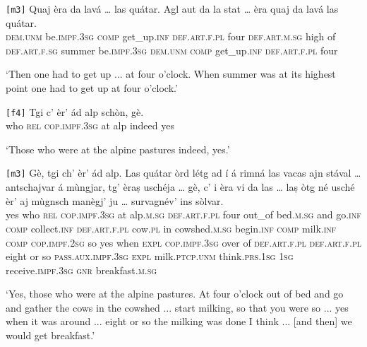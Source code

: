 \begin{linenumbers}
	\gll \texttt{[m3]} Quaj èra da lavá … las quátar. Agl aut da la stat … èra quaj da lavá las quátar.\\
	{} \textsc{dem.unm} be.\textsc{impf.3sg} \textsc{comp} get\_up.\textsc{inf} {} \textsc{def.art.f.pl} four \textsc{def.art.m.sg} high of \textsc{def.art.f.sg} summer {} be.\textsc{impf.3sg} \textsc{dem.unm} \textsc{comp} get\_up.\textsc{inf} \textsc{def.art.f.pl} four \\
	\end{linenumbers}
\medskip
\glt `Then one had to get up ... at four o'clock. When summer was at its highest point one had to get up at four o'clock.'
\medskip

\begin{linenumbers}
	\gll \texttt{[f4]} Tgi c’ èr’ ád alp schòn, gè.   \\
	{} who \textsc{rel} \textsc{cop.impf.3sg} at alp indeed yes\\
\end{linenumbers}
\medskip
\glt `Those who were at the alpine pastures indeed, yes.'
\medskip

\begin{linenumbers}
	\gll \texttt{[m3]} Gè, tgi ch’ èr’ ád alp. Las quátar òrd létg ad í á rimná las vacas ajn stával … antschajvar á mùngjar, tg’ èraṣ uschéja … gè, c' i èra vi da las … laṣ òtg né usché èr’ aj mùgnsch manègj’ ju … survagnév’ ins sòlvar.\\
	{} yes who \textsc{rel} \textsc{cop.impf.3sg} at alp.\textsc{m.sg} \textsc{def.art.f.pl} four out\_of bed.\textsc{m.sg} and go.\textsc{inf} \textsc{comp} collect.\textsc{inf} \textsc{def.art.f.pl} cow.\textsc{pl} in cowshed.\textsc{m.sg} {} begin.\textsc{inf} \textsc{comp} milk.\textsc{inf} \textsc{comp} \textsc{cop.impf.2sg} so {} yes when \textsc{expl} \textsc{cop.impf.3sg} over of \textsc{def.art.f.pl} {} \textsc{def.art.f.pl} eight or so \textsc{pass.aux.impf.3sg} \textsc{expl} milk.\textsc{ptcp.unm} think.\textsc{prs.1sg} \textsc{1sg} {} receive.\textsc{impf.3sg} \textsc{gnr} breakfast.\textsc{m.sg} \\
\end{linenumbers}
\medskip
\glt `Yes, those who were at the alpine pastures. At four o'clock out of bed and go and gather the cows in the cowshed ... start milking, so that you were so ... yes when it was around ... eight or so the milking was done I think ... [and then] we would get breakfast.'
\medskip


